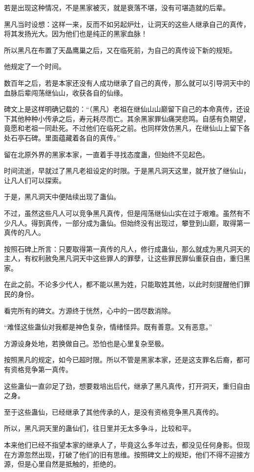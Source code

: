 \begin{this_body}
若是出现这种情况，不是黑家被灭，就是衰落不堪，没有可堪造就的后辈。

黑凡当时设想：这样一来，反而不如另起炉灶，让洞天的这些人继承自己的真传，将其发扬光大。因为他们也是纯正的黑家血脉！

所以黑凡在布置了天晶鹰巢之后，又在临死前，为自己的真传设下新的规矩。

他规定了一个时间。

数百年之后，若是本家还没有人成功继承了自己的真传，那么就可以引导洞天中的血脉后辈闯荡继仙山，收获各自的仙缘。

碑文上是这样明确记载的：“（黑凡）老祖在继仙山山巅留下自己的本命真传，还设下其他种种小传承之后，寿元耗尽而亡。其余黑家罪仙痛哭悲鸣。自感有负期望，竟愿和老祖一同赴死。不过他们在临死之前。也同样效仿黑凡，在继仙山上留下各处石亭石碑。里面蕴藏着各自的真传。”

留在北原外界的黑家本家，一直着手寻找态度蛊，但始终不见起色。

时间流逝，早就过了黑凡老祖设定的时限。于是黑凡洞天这里，就开放了继仙山，让凡人们可以探索。

于是，黑凡洞天中便陆续出现了蛊仙。

不过，虽然这些凡人可以竞争黑凡真传，但是闯荡继仙山实在过于艰难。虽然有不少凡人。得到真传，一部分成为蛊仙。但始终没有出现过，攀登到山巅，取得第一真传的凡人。

按照石碑上所言：只要取得第一真传的凡人，修行成蛊仙，那么就成为黑凡洞天的主人，有权利赦免黑凡洞天中这些罪人的罪孽，让这些罪民罪仙重获自由，重归黑家。

在此之前。不论多少代人，都不能以黑为姓，只能取姓其他，以此时刻提醒他们罪民的身份。

看完所有的碑文。方源终于恍然，心中的一团尽数消除。

“难怪这些蛊仙对我都是神色复杂，情绪怪异。既有善意。又有恶意。”

方源设身处地，若换做自己。恐怕也是心里复杂至极。

按照黑凡的规定，如今已超时限。所以不管是黑家本家，还是这支罪名后裔，都可有资格竞争第一真传。

这些蛊仙一直卯足了劲，想要栽培出后代，继承了黑凡真传，打开洞天，重归自由之身。

至于这些蛊仙，已经继承了其他传承的人，是没有资格竞争黑凡真传的。

所以，黑凡洞天里的蛊仙们，往日里并无太多争斗，比较和平。

本来他们已经不指望本家的继承人了，毕竟这么多年过去，都没见任何身影。但现在方源忽然出现，打破了他们的旧有思维。按照碑文上的规矩，他们不得不迎接方源，但是心里自然是抵触的，拒绝的。


\end{this_body}
